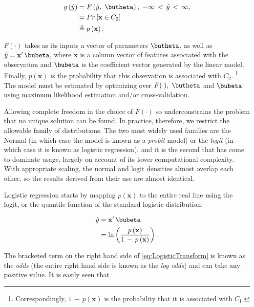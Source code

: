 \documentclass[graybox,envcountchap,sectrefs]{svmono}\usepackage[]{graphicx}\usepackage[]{xcolor}
\begin{document}
\begin{appendices}
\begin{align}
g\left(\hat{y}\right) & =F\left(\hat{y},\ \butheta\right),\ -\infty\,<\,\hat{y}\,<\,\infty,\nonumber \\
 & =Pr\left[\mathbf{x}\in C_{2}\right]\nonumber \\
 & \triangleq p\left(\mathbf{x}\right).\label{eq:Probit}
\end{align}

$F(\cdot)$ takes as its inputs a vector of parameters $\butheta$,
as well as $\hat{y}=\mathbf{x}^{\prime}\,\bubeta$, where $\mathbf{x}$
is a column vector of features associated with the observation and
$\bubeta$ is the coefficient vector generated by the linear model.
Finally, $p\left(\mathbf{x}\right)$ is the probability that this
observation is associated with $C_{2}$. \footnote{Correspondingly, $1\,-\,p\left(\mathbf{x}\right)$ is the probability
that it is associated with $C_{1}$.} The model must be estimated by optimizing over $F(\cdot),\ \butheta$
and $\bubeta$ using maximum likelihood estimation and/or cross-validation.

Allowing complete freedom in the choice of $F(\cdot)$ so underconstrains
the problem that no unique solution can be found. In practice, therefore,
we restrict the allowable family of distributions. The two most widely
used families are the Normal (in which case the model is known as
a \emph{probit} model) or the \emph{logit} (in which case it is known
as logistic regression), and it is the second that has come to dominate
usage, largely on account of its lower computational complexity. With
appropriate scaling, the normal and logit densities almost overlap
each other, so the results derived from their use are almost identical.

Logistic regression starts by mapping $p\left(\mathbf{x}\right)$
to the entire real line using the logit, or the quantile function
of the standard logistic distribution:

\begin{align}
\hat{y} & =\mathbf{x}^{\prime}\,\bubeta\nonumber \\
 & =\ln\left(\frac{p\left(\mathbf{x}\right)}{1\,-\,p\left(\mathbf{x}\right)}\right).\label{eq:LogisticTransform}
\end{align}

The bracketed term on the right hand side of \eqref{eq:LogisticTransform}
is known as the \emph{odds} (the entire right hand side is known as
the \emph{log odds}) and can take any positive value. It is easily
seen that


\end{appendices}
\end{document}
